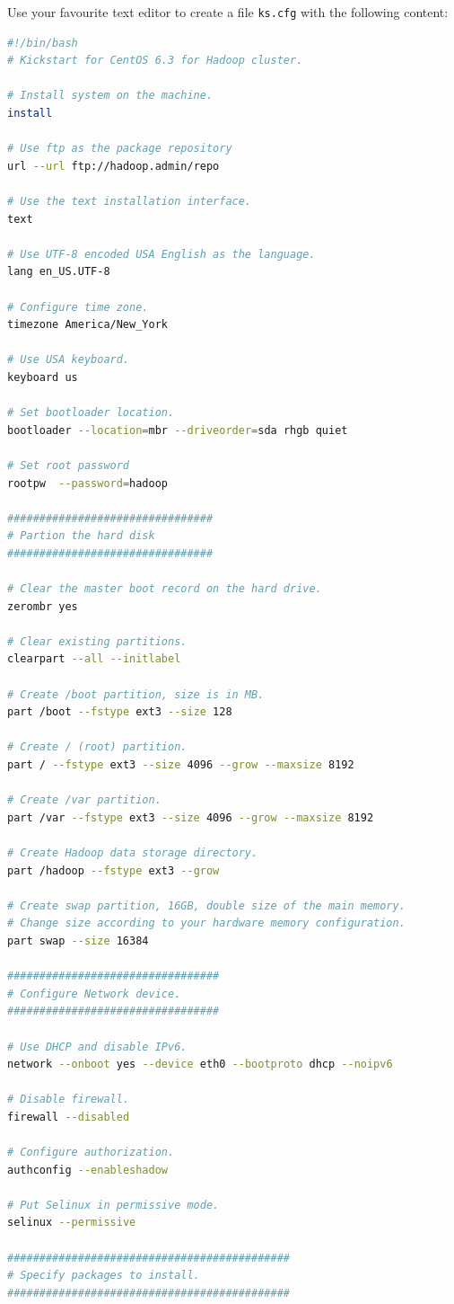 Use your favourite text editor to create a file \verb|ks.cfg| with the following content:
\lstset{style=bashstyle}
\begin{lstlisting}[language=bash]
#!/bin/bash
# Kickstart for CentOS 6.3 for Hadoop cluster.

# Install system on the machine.
install

# Use ftp as the package repository
url --url ftp://hadoop.admin/repo

# Use the text installation interface.
text

# Use UTF-8 encoded USA English as the language.
lang en_US.UTF-8

# Configure time zone.
timezone America/New_York

# Use USA keyboard.
keyboard us

# Set bootloader location.
bootloader --location=mbr --driveorder=sda rhgb quiet

# Set root password
rootpw  --password=hadoop

################################
# Partion the hard disk
################################

# Clear the master boot record on the hard drive.
zerombr yes

# Clear existing partitions.
clearpart --all --initlabel

# Create /boot partition, size is in MB.
part /boot --fstype ext3 --size 128

# Create / (root) partition.
part / --fstype ext3 --size 4096 --grow --maxsize 8192

# Create /var partition.
part /var --fstype ext3 --size 4096 --grow --maxsize 8192

# Create Hadoop data storage directory.
part /hadoop --fstype ext3 --grow

# Create swap partition, 16GB, double size of the main memory.
# Change size according to your hardware memory configuration.
part swap --size 16384

#################################
# Configure Network device.
#################################

# Use DHCP and disable IPv6.
network --onboot yes --device eth0 --bootproto dhcp --noipv6

# Disable firewall.
firewall --disabled

# Configure authorization.
authconfig --enableshadow

# Put Selinux in permissive mode.
selinux --permissive

############################################
# Specify packages to install.
############################################


\end{lstlisting}
